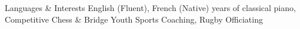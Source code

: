 \begin{rubric}{\color{ForestGreen} Languages \& Interests}
  \entry*[Languages] English (Fluent), French (Native)
   years of classical piano, Competitive Chess \& Bridge
   Youth Sports Coaching, Rugby Officiating
\end{rubric}
